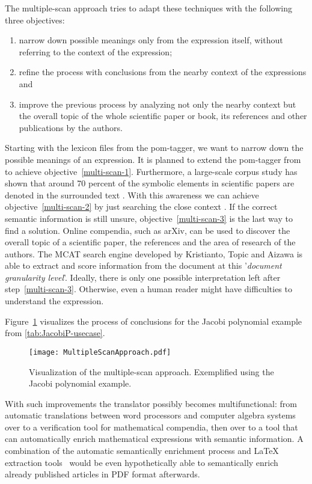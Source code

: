 The multiple-scan approach tries to adapt these techniques with the following three objectives:
\begin{enumerate}[label=(\arabic*)]
\item\label{multi-scan-1} narrow down possible meanings only from the expression itself, without referring to the context of the expression;
\item\label{multi-scan-2} refine the process with conclusions from the nearby context of the expressions and
\item\label{multi-scan-3} improve the previous process by analyzing not only the nearby context but the overall topic of the whole scientific paper or book, its references and other publications by the authors.
\end{enumerate}
Starting with the lexicon files from the \gls{pom}-tagger, we want to narrow down the possible meanings of an expression. It is planned to extend the \gls{pom}-tagger from \cite{POM-Tagger} to achieve objective~\ref{multi-scan-1}. Furthermore, a large-scale corpus study has shown that around 70 percent of the symbolic elements in scientific papers are denoted in the surrounded text \cite{SymbolDec}. With this awareness we can achieve objective~\ref{multi-scan-2} by just searching the close context \cite{MLP:Project,SIGIR:Semantification,MORITZ:Evaluating}. If the correct semantic information is still unsure, objective~\ref{multi-scan-3} is the last way to find a solution. Online compendia, such as arXiv, can be used to discover the overall topic of a scientific paper, the references and the area of research of the authors. The MCAT search engine developed by Kristianto, Topic and Aizawa \cite{MCAT,MCAT:MathSemanticSearch} is able to extract and score information from the document at this '\textit{document granularity level}'. Ideally, there is only one possible interpretation left after step~\ref{multi-scan-3}. Otherwise, even a human reader might have difficulties to understand the expression.

Figure~\ref{fig:multiple-scan} visualizes the process of conclusions for the Jacobi polynomial example from \cref{tab:JacobiP-usecase}.

\begin{figure}[htp]
	\centering
	\texttt{[image: MultipleScanApproach.pdf]}
	\caption{Visualization of the multiple-scan approach. Exemplified using the Jacobi polynomial example.}
	\label{fig:multiple-scan}
\end{figure}

With such improvements the translator possibly becomes multifunctional: from automatic translations between word processors and computer algebra systems over to a verification tool for mathematical compendia, then over to a tool that can automatically enrich mathematical expressions with semantic information. A combination of the automatic semantically enrichment process and \LaTeX{} extraction tools~\cite{MaxTract} would be even hypothetically able to semantically enrich already published articles in PDF format afterwards.

\cleardoublepage